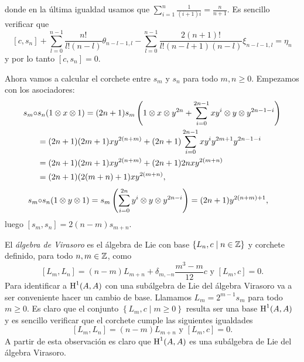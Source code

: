 \documentclass[fleqn,../tesis.tex]{subfiles}
\begin{document}
donde en la última igualdad usamos que $\sum_{i = 1 }^{n}\frac{1}{(i + 1)i} = \frac{n}{n + 1}$. Es
sencillo verificar que
\[
	\left[c, s_n\right] + \sum_{l = 0}^{n - 1}\frac{n!}{l!(n - l)}\theta_{n - l - 1, l}
	 - \sum_{l = 0}^{n - 1}\frac{2(n + 1)!}{l!(n - l + 1)(n -l)}\xi_{n - l - 1, l}= \eta_n
\]
y por lo tanto $\left[c, s_n\right] = 0$.

Ahora vamos a calcular el corchete entre $s_m$ y $s_n$ para todo $m, n \geq 0$. Empezamos
con los asociadores:
\begin{align*}
	s_m \circ & s_n(1 \otimes x \otimes 1)
		= (2n + 1)s_m\left(1 \otimes x \otimes y^{2n}
			+ \sum_{i = 0}^{2n - 1}xy^i \otimes y \otimes y^{2n -1 -i}\right)\\
	&= (2n + 1)(2m + 1)xy^{2(n + m)} + (2n + 1)\sum_{i = 0}^{2n - 1}xy^{i}y^{2m + 1}y^{2n - 1 -i}\\
	&= (2n + 1)(2m + 1)xy^{2(n + m)} + (2n + 1)2nxy^{2(m + n)}\\
	&= (2n + 1)(2(m +n) + 1)xy^{2(m + n)},
\end{align*}
\begin{align*}
	s_m \circ & s_n(1 \otimes y \otimes 1)
		=s_m\left(\sum_{i = 0}^{2n}y^{i}\otimes y \otimes y^{2n - i}\right) = (2n + 1)y^{2(n + m)+ 1},
\end{align*}
luego $\left[s_m, s_n\right] = 2(n - m)s_{m + n}$.

El \emph{álgebra de Virasoro} es el álgebra de Lie con base
	$\left\lbrace L_n, c \mid n \in \mathbb{Z}\right\rbrace$ y corchete definido, para todo $n, m \in \mathbb{Z}$, como
\[
	\left[L_m, L_n\right] = (n - m)L_{m + n} + \delta_{m, -n}\frac{m^3 - m}{12}c
		\text{ y } \left[L_m, c\right] = 0.	
\]
Para identificar a $\operatorname{H}^{1}(A,A)$ con una subálgebra de Lie del álgebra Virasoro va a ser conveniente
hacer un cambio de base. Llamamos $L_m = 2^{m - 1}s_m$ para todo $m \geq 0$. Es claro
que el conjunto $\left\lbrace L_m, c \mid m \geq 0 \right\rbrace$ resulta ser una base $\operatorname{H}^{1}(A,A)$
y es sencillo verificar que el corchete cumple las siguientes igualdades
\[
	\left[L_m, L_n\right] = (n - m)L_{m + n} \text{ y } \left[L_m, c\right] = 0.	
\]
A partir de esta observación es claro que $\operatorname{H}^{1}(A,A)$ es una subálgebra de Lie del álgebra Virasoro.
\end{document}
